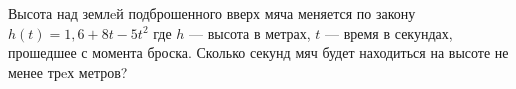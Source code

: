 \begin{class}[number=5]
\begin{listofex}
\begin{minipage}[t]{0.22\textwidth}
		\end{minipage}
		\item Высота над землeй подброшенного вверх мяча меняется по закону \(h(t)=1,6+8t-5t^2\) где \(h\) --- высота в метрах, \(t\) --- время в секундах, прошедшее с момента броска. Сколько секунд мяч будет
		находиться на высоте не менее трeх метров?
		\item {}

\end{listofex}
\end{class}

